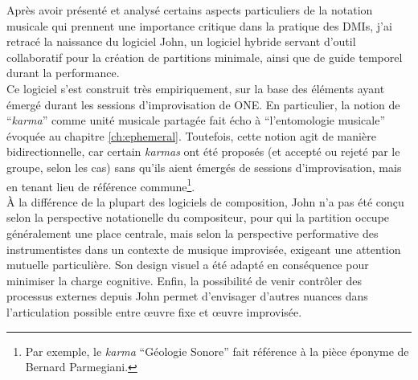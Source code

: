\noindent Après avoir présenté et analysé certains aspects particuliers de la notation musicale qui prennent une importance critique dans la pratique des \glspl{DMI}, j'ai retracé la naissance du logiciel John, un logiciel hybride servant d'outil collaboratif pour la création de partitions minimale, ainsi que de guide temporel durant la performance.\\
\indent Ce logiciel s'est construit très empiriquement, sur la base des éléments ayant émergé durant les sessions d'improvisation de ONE. En particulier, la notion de ``\textit{karma}'' comme unité musicale partagée fait écho à ``l'entomologie musicale'' évoquée au chapitre \ref{ch:ephemeral}. Toutefois, cette notion agit de manière bidirectionnelle, car certain \textit{karmas} ont été proposés (et accepté ou rejeté par le groupe, selon les cas) sans qu'ils aient émergés de sessions d'improvisation, mais en tenant lieu de référence commune\footnote{Par exemple, le \textit{karma} ``Géologie Sonore'' fait référence à la pièce éponyme de Bernard Parmegiani.}.\\
\indent À la différence de la plupart des logiciels de composition, John n'a pas été conçu selon la perspective notationelle du compositeur, pour qui la partition occupe généralement une place centrale, mais selon la perspective performative des instrumentistes dans un contexte de musique improvisée, exigeant une attention mutuelle particulière. Son design visuel a été adapté en conséquence pour minimiser la charge cognitive. Enfin, la possibilité de venir contrôler des processus externes depuis John permet d'envisager d'autres nuances dans l'articulation possible entre œuvre fixe et œuvre improvisée.



